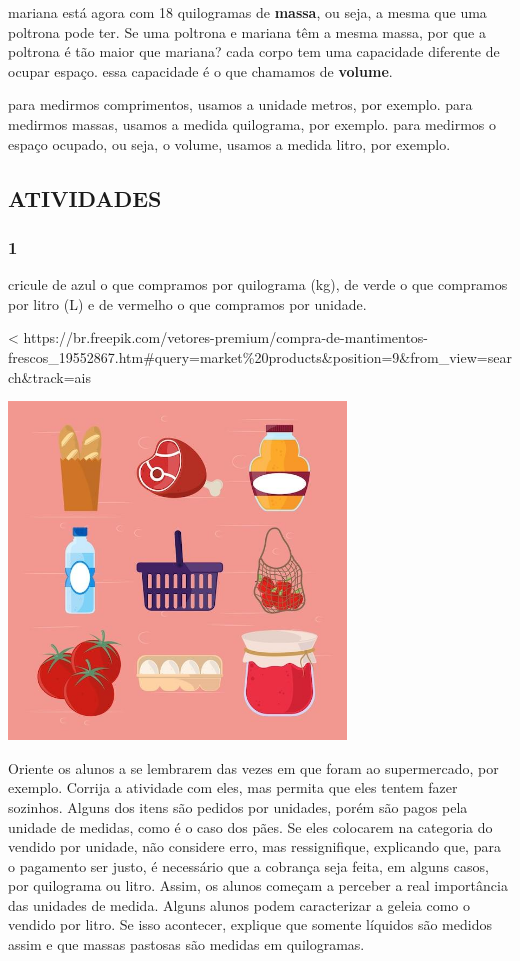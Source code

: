 mariana está agora com 18 quilogramas de \textbf{massa}, ou seja, a mesma que uma poltrona pode ter. Se uma poltrona e mariana têm a mesma massa, por que a poltrona é
tão maior que mariana? cada corpo tem uma capacidade diferente de ocupar
espaço. essa capacidade é o que chamamos de \textbf{volume}.

para medirmos comprimentos, usamos a unidade metros, por exemplo. para medirmos massas, usamos a medida
quilograma, por exemplo. para medirmos o espaço ocupado, ou seja, o volume, usamos
a medida litro, por exemplo.

\subsection{ATIVIDADES }\label{atividades-2}

\subsubsection{1}\label{section-27}

cricule de azul o que compramos por quilograma (kg), de verde o que
compramos por litro (L) e de vermelho o que compramos por unidade.

\textless{}
https://br.freepik.com/vetores-premium/compra-de-mantimentos-frescos\_19552867.htm\#query=market\%20products\&position=9\&from\_view=search\&track=ais

\includegraphics[width=3.53125in,height=3.53125in]{media/image23.jpg}

Oriente os alunos a se lembrarem das vezes em que foram ao
supermercado, por exemplo. Corrija a atividade com eles, mas permita que
eles tentem fazer sozinhos. Alguns dos itens são pedidos por unidades,
porém são pagos pela unidade de medidas, como é o caso dos pães. Se eles
colocarem na categoria do vendido por unidade, não considere erro, mas ressignifique, explicando
que, para o pagamento ser justo, é necessário que a cobrança seja feita, em alguns casos,
por quilograma ou litro. Assim, os alunos começam a perceber a real
importância das unidades de medida. Alguns alunos podem caracterizar a geleia como o vendido por litro. Se isso acontecer, explique
que somente líquidos são medidos assim e que massas pastosas são
medidas em quilogramas.

